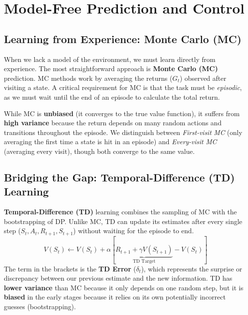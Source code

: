 \section{Model-Free Prediction and Control}

\subsection{Learning from Experience: Monte Carlo (MC)}
When we lack a model of the environment, we must learn directly from experience. The most straightforward approach is \textbf{Monte Carlo (MC)} prediction. MC methods work by averaging the returns ($G_t$) observed after visiting a state. A critical requirement for MC is that the task must be \textit{episodic}, as we must wait until the end of an episode to calculate the total return.

While MC is \textbf{unbiased} (it converges to the true value function), it suffers from \textbf{high variance} because the return depends on many random actions and transitions throughout the episode. We distinguish between \textit{First-visit MC} (only averaging the first time a state is hit in an episode) and \textit{Every-visit MC} (averaging every visit), though both converge to the same value.

\subsection{Bridging the Gap: Temporal-Difference (TD) Learning}
\textbf{Temporal-Difference (TD)} learning combines the sampling of MC with the bootstrapping of DP. Unlike MC, TD can update its estimates after every single step ($S_t, A_t, R_{t+1}, S_{t+1}$) without waiting for the episode to end.
\[ V(S_t) \leftarrow V(S_t) + \alpha [ \underbrace{R_{t+1} + \gamma V(S_{t+1})}_{\text{TD Target}} - V(S_t) ] \]
The term in the brackets is the \textbf{TD Error} ($\delta_t$), which represents the surprise or discrepancy between our previous estimate and the new information. TD has \textbf{lower variance} than MC because it only depends on one random step, but it is \textbf{biased} in the early stages because it relies on its own potentially incorrect guesses (bootstrapping).

